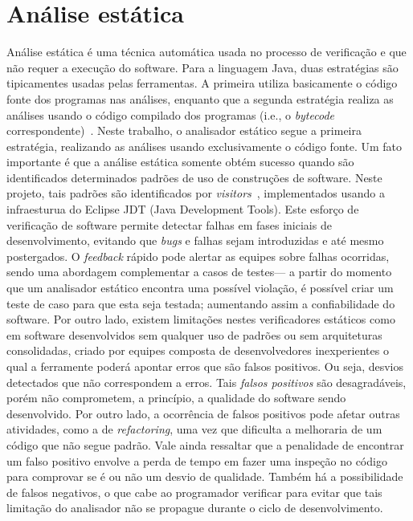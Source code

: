 \section{Análise estática}

Análise estática é uma técnica automática usada no processo de verificação e que n\~{a}o requer a 
execu\c c\~{a}o do software. Para a linguagem Java, duas estrat\'{e}gias s\~{a}o tipicamentes usadas pelas ferramentas. 
A primeira utiliza basicamente o código fonte dos programas nas an\'{a}lises, enquanto que a segunda estrat\'{e}gia 
realiza as an\'{a}lises usando o c\'{o}digo compilado dos programas (i.e., o \emph{bytecode} correspondente)~\cite{Ayewah:2008:USA:1439186.1439221}. 
Neste trabalho, o analisador est\'{a}tico segue a primeira estrat\'{e}gia, realizando as an\'{a}lises 
usando exclusivamente o código fonte. %
Um fato importante é que a análise est\'{a}tica somente obtém sucesso quando s\~{a}o identificados determinados padrões de uso 
de constru\c c\~{o}es de software. Neste projeto, tais padr\~{o}es são identificados por {\it visitors}~\cite{Gamma:1995}, implementados usando 
a infraesturua do Eclipse JDT (Java Development Tools).
Este esfor\c co de verificação de software permite detectar falhas em fases iniciais de  desenvolvimento, 
evitando que \emph{bugs} e falhas sejam introduzidas e até mesmo postergados. O {\it  feedback} rápido pode alertar as equipes sobre 
falhas ocorridas, sendo uma abordagem complementar a casos de testes---  a partir do momento que um analisador est\'{a}tico encontra 
uma poss\'{i}vel viola\c c\~{a}o, é possível criar um teste de caso para que esta seja testada; aumentando assim a confiabilidade do software.
Por outro lado, existem limitações nestes verificadores estáticos como em software desenvolvidos sem qualquer uso de padrões ou 
sem arquiteturas consolidadas, criado por equipes composta de desenvolvedores inexperientes o qual a ferramente poderá apontar erros que são falsos positivos. 
Ou seja, desvios detectados que não correspondem a erros. 
Tais \emph{falsos positivos} são desagradáveis, porém não comprometem, a princ\'{i}pio, a qualidade do 
software sendo desenvolvido. Por outro lado, a ocorr\^{e}ncia de falsos positivos pode afetar outras atividades, como a de {\it refactoring}, 
uma vez que dificulta a melhoraria de um código que não segue padrão. Vale ainda ressaltar que a penalidade de encontrar um falso 
positivo envolve a perda de tempo em fazer uma inspeção no código para comprovar se é ou não um desvio de qualidade. 
Também há a possibilidade de falsos negativos, o que cabe ao programador verificar para evitar que tais limitação do analisador não se propague durante o ciclo de desenvolvimento.
